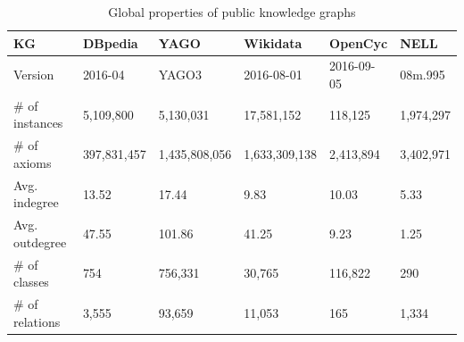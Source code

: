﻿\documentclass[11pt,titlepage,oneside,openany]{book}
\begin{document}
\begin{table}[h]
\begin{center}
\begin{footnotesize}
\begin{tabular*}{\textwidth}{|l|l|l|l|l|l|}
\hline
KG & DBpedia & YAGO & Wikidata & OpenCyc & NELL \\ \hline
Version & 2016-04 & YAGO3 & 2016-08-01 & 2016-09-05 & 08m.995 \\ \hline
\# of instances & 5,109,800 & 5,130,031 & 17,581,152 & 118,125 & 1,974,297 \\
\# of axioms & 397,831,457 & 1,435,808,056 & 1,633,309,138 & 2,413,894 & 3,402,971 \\
Avg. indegree & 13.52 & 17.44 & 9.83 & 10.03 & 5.33 \\
Avg. outdegree & 47.55 & 101.86 & 41.25 & 9.23 & 1.25 \\ 
\# of classes & 754 & 756,331 & 30,765 & 116,822 & 290 \\
\# of relations & 3,555 & 93,659 & 11,053 & 165 & 1,334 \\ \hline
\end{tabular*}
\end{footnotesize}
\caption[Properties of knowledge graphs]{Global properties of public knowledge graphs \cite{Ringler2017OneKG}}
\label{tab:propertiesKG}
\end{center}
\end{table}
\end{document}
